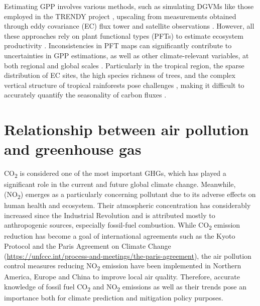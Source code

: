 Estimating GPP involves various methods, such as simulating DGVMs like those employed in the TRENDY project \citep{sitch2015recent, le2018global}, upscaling from measurements obtained through eddy covariance (EC) flux tower and satellite observations \citep{jung2019fluxcom, zeng2020global}. However, all these approaches rely on plant functional types (PFTs) to estimate ecosystem productivity \citep{poulter2011plant, poulter2015plant, lin2021improved, guo2023estimating, yan2023integrating}. Inconsistencies in PFT maps can significantly contribute to uncertainties in GPP estimations, as well as other climate-relevant variables, at both regional and global scales \citep{poulter2011plant}. Particularly in the tropical region, the sparse distribution of EC sites, the high species richness of trees, and the complex vertical structure of tropical rainforests pose challenges \citep{montgomery2001forest}, making it difficult to accurately quantify the seasonality of carbon fluxes \citep{xu2015satellite}. \par

\section{Relationship between air pollution and greenhouse gas}
CO\textsubscript{2} is considered one of the most important GHGs, which has played a significant role in the current and future global climate change. Meanwhile, (NO\textsubscript{2}) emerges as a particularly concerning pollutant due to its adverse effects on human health and ecosystem. Their atmospheric concentration has considerably increased since the Industrial Revolution and is attributed mostly to anthropogenic sources, especially fossil-fuel combustion. While CO\textsubscript{2} emission reduction has become a goal of international agreements such as the Kyoto Protocol \citep{protocol1997united} and the Paris Agreement on Climate Change (\url{https://unfccc.int/process-and-meetings/the-paris-agreement}), the air pollution control measures reducing NO\textsubscript{2} emission have been implemented in Northern America, Europe and China to improve local air quality. Therefore, accurate knowledge of fossil fuel CO\textsubscript{2} and NO\textsubscript{2} emissions as well as their trends pose an importance both for climate prediction and mitigation policy purposes. \par

